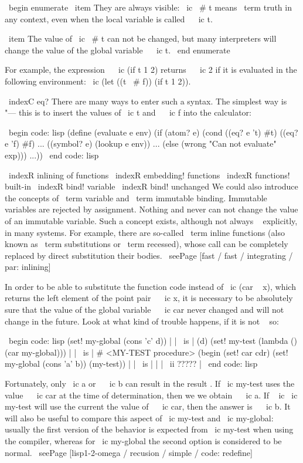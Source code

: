 {{\ begin {enumerate}
  \ item They are always visible: \ ic { \ # t} means \ term {truth} in any
        context, even when the local variable
        is called ~ \ ic {t}.

  \ item The value of \ ic { \ # t} can not be changed, but many interpreters
        will change the value of the global variable ~ \ ic {t}.
\ end {enumerate}

For example, the expression ~ \ ic {(if t 1 2)} returns ~ \ ic {2} if it is evaluated
in the following environment: \ ic {(let ((t \ # f)) (if t 1 2))}.

\ indexC {eq?}
There are many ways to enter such a syntax. The simplest way is "---
this is to insert the values ​​of \ ic {t} and ~ \ ic {f} into the calculator:

\ begin {code: lisp}
(define (evaluate e env)
  (if (atom? e)
      (cond ((eq? e 't) #t)
            ((eq? e 'f) #f)
            ...
            ((symbol? e) (lookup e env))
            ...
            (else (wrong "Can not evaluate" exp)))
      ...))
\ end {code: lisp}

\ indexR {inlining of functions}
\ indexR {embedding!} functions
\ indexR {functions! built-in}
\ indexR {bind! variable}
\ indexR {bind! unchanged}
We could also introduce the concepts of \ term {variable} and \ term {immutable}
binding. Immutable variables are rejected by assignment. Nothing and never
can not change the value of an immutable variable. Such a concept exists,
although not always ~ explicitly, in many systems. For example, there are so-called
\ term {inline functions} (also known as \ term {substitutions} or
\ term {recessed}), whose call can be completely replaced by direct substitution
their bodies. \ seePage [fast / fast / integrating / par: inlining]

In order to be able to substitute the function code instead of \ ic {(car ~ x)},
which returns the left element of the point pair ~ \ ic {x}, it is necessary to be absolutely
sure that the value of the global variable ~ \ ic {car} never changed
and will not change in the future. Look at what kind of trouble happens, if it is not ~ so:

\ begin {code: lisp}
(set! my-global (cons 'c' d))
   | | \ is | (d)
(set! my-test (lambda () (car my-global)))
   | | \ is | # <MY-TEST procedure>
(begin (set! car cdr)
       (set! my-global (cons 'a' b))
       (my-test))
   | | \ is | | | \ ii {?????} |
\ end {code: lisp}

Fortunately, only \ ic {a} or ~ \ ic {b} can result in the result . If
\ ic {my-test} uses the value ~ \ ic {car} at the time of determination, then we
we obtain ~ \ ic {a}. If ~ ic \ ic {my-test} will use the current
the value of ~ \ ic {car}, then the answer is ~ \ ic {b}. It will also be useful to compare this
aspect of \ ic {my-test} and \ ic {my-global}: usually the first version of the behavior is expected
from \ ic {my-test} when using the compiler, whereas for \ ic {my-global}
the second option is considered to be normal.
\ seePage [lisp1-2-omega / recusion / simple / code: redefine]

}}

